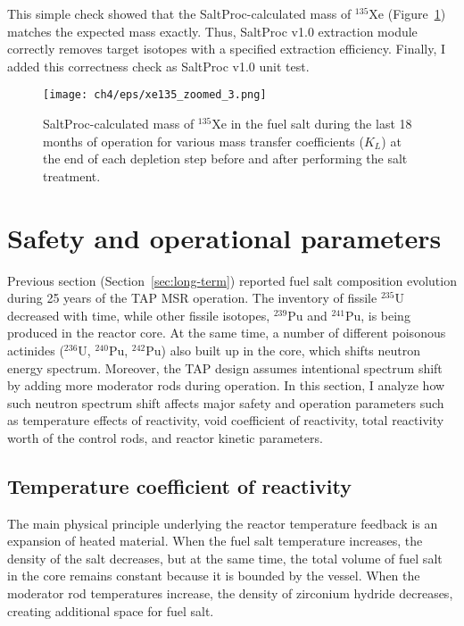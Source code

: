 This simple check showed that the SaltProc-calculated mass of $^{135}$Xe 
(Figure~\ref{fig:xe135-eps-var-zoomes}) matches the expected mass exactly. 
Thus, SaltProc v1.0 extraction module correctly removes target isotopes with a
specified extraction efficiency. Finally, I added this correctness check as  
SaltProc v1.0 unit test.
\begin{figure}[htp!] %
	\centering
	\texttt{[image: ch4/eps/xe135\_zoomed\_3.png]}
	\caption{SaltProc-calculated mass of $^{135}$Xe in the fuel salt during 
	the last 18 months of operation for various mass transfer coefficients 
	($K_L$) at the end of each depletion step before and after performing the 
	salt treatment.}
	\label{fig:xe135-eps-var-zoomes}
\end{figure}
\FloatBarrier


\section{Safety and operational parameters} \label{sec:safety-param}
Previous section (Section~\ref{sec:long-term}) reported fuel salt 
composition evolution during 25 years of the \gls{TAP} \gls{MSR} operation.
The inventory of fissile $^{235}$U decreased with time, while other fissile 
isotopes, $^{239}$Pu and $^{241}$Pu, is being produced in the reactor core. At 
the same time, a number of different poisonous actinides ($^{236}$U, 
$^{240}$Pu, $^{242}$Pu) also built up in the core, which shifts neutron energy 
spectrum. Moreover, the \gls{TAP} design assumes intentional spectrum shift by 
adding more moderator rods during operation. In this section, I analyze how 
such neutron spectrum shift affects major safety and operation parameters such 
as temperature effects of reactivity, void coefficient of reactivity, total 
reactivity worth of the control rods, and reactor kinetic parameters.

\subsection{Temperature coefficient of reactivity}
The main physical principle underlying the reactor temperature feedback is an 
expansion of heated material. When the fuel salt temperature increases, the 
density of the salt decreases, but at the same time, the total volume of fuel 
salt in the core remains constant because it is bounded by the vessel. When 
the moderator rod temperatures increase, the density of zirconium hydride 
decreases, creating additional space for fuel salt. 

